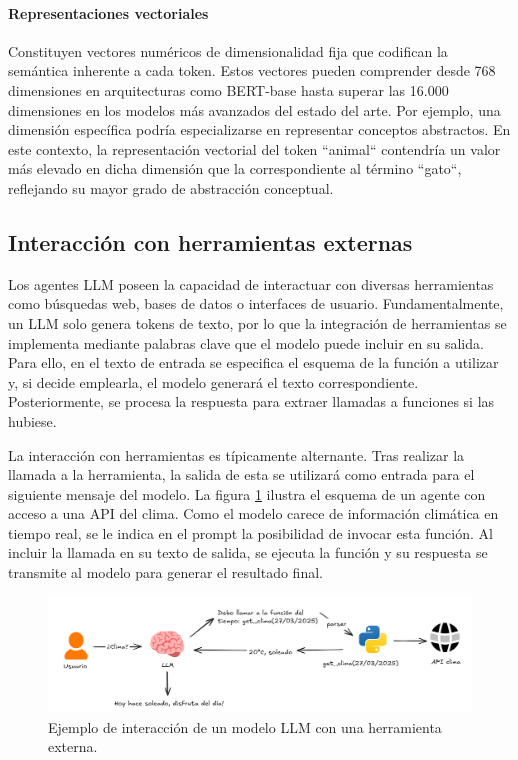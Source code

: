 \paragraph{Representaciones vectoriales}
Constituyen vectores numéricos de dimensionalidad fija que codifican la semántica inherente a cada token. Estos vectores pueden comprender desde 768 dimensiones en arquitecturas como BERT-base hasta superar las 16.000 dimensiones en los modelos más avanzados del estado del arte. Por ejemplo, una dimensión específica podría especializarse en representar conceptos abstractos. En este contexto, la representación vectorial del token ``animal`` contendría un valor más elevado en dicha dimensión que la correspondiente al término ``gato``, reflejando su mayor grado de abstracción conceptual.


\subsection{Interacción con herramientas externas}
Los agentes LLM poseen la capacidad de interactuar con diversas herramientas como búsquedas web, bases de datos o interfaces de usuario. Fundamentalmente, un LLM solo genera tokens de texto, por lo que la integración de herramientas se implementa mediante palabras clave que el modelo puede incluir en su salida. Para ello, en el texto de entrada se especifica el esquema de la función a utilizar y, si decide emplearla, el modelo generará el texto correspondiente. Posteriormente, se procesa la respuesta para extraer llamadas a funciones si las hubiese.

La interacción con herramientas es típicamente alternante. Tras realizar la llamada a la herramienta, la salida de esta se utilizará como entrada para el siguiente mensaje del modelo. La figura \ref{fig:herramientas} ilustra el esquema de un agente con acceso a una API del clima. Como el modelo carece de información climática en tiempo real, se le indica en el prompt la posibilidad de invocar esta función. Al incluir la llamada en su texto de salida, se ejecuta la función y su respuesta se transmite al modelo para generar el resultado final.

\begin{figure}
  \centering
  \includegraphics[width=1\linewidth]{figures/herramienta.png}
  \caption{Ejemplo de interacción de un modelo LLM con una herramienta externa.}
  \label{fig:herramientas}
\end{figure}


